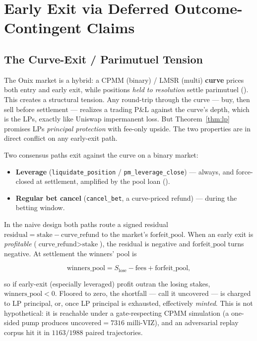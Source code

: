 \documentclass{ledger}
\theoremstyle{plain}
\theoremstyle{remark}
\begin{document}
\section{Early Exit via Deferred Outcome-Contingent Claims}\label{sec:earlyexit}

\subsection{The Curve-Exit / Parimutuel Tension}\label{sec:exittension}

The Onix market is a hybrid: a CPMM (binary) / LMSR (multi) \textbf{curve} prices
both entry and early exit, while positions \emph{held to resolution} settle
parimutuel (). This creates a structural tension. Any
round-trip through the curve --- buy, then sell before settlement --- realizes a
trading P\&L against the curve's depth, which is the LPs, exactly like Uniswap
impermanent loss. But Theorem~\ref{thm:lp} promises LPs \emph{principal
protection} with fee-only upside. The two properties are in direct conflict on
any early-exit path.

Two consensus paths exit against the curve on a binary market:

\begin{itemize}
  \item \textbf{Leverage} (\texttt{liquidate\_position} / \texttt{pm\_leverage\_close})
  --- always, and force-closed at settlement, amplified by the pool loan
  ().
  \item \textbf{Regular bet cancel} (\texttt{cancel\_bet}, a curve-priced refund)
  --- during the betting window.
\end{itemize}

In the naive design both paths route a signed residual
$\text{residual} = \text{stake} - \text{curve\_refund}$ to the market's
$\text{forfeit\_pool}$. When an early exit is \emph{profitable}
($\text{curve\_refund} > \text{stake}$), the residual is negative and
$\text{forfeit\_pool}$ turns negative. At settlement the winners' pool is

\[
\text{winners\_pool} = S_{\text{lose}} - \text{fees} + \text{forfeit\_pool},
\]

so if early-exit (especially leveraged) profit outran the losing stakes,
$\text{winners\_pool} < 0$. Floored to zero, the shortfall --- call it
$\text{uncovered}$ --- is charged to LP principal, or, once LP principal is
exhausted, effectively \emph{minted}. This is not hypothetical: it is reachable
under a gate-respecting CPMM simulation (a one-sided pump produces
$\text{uncovered} = 7316$ milli-VIZ), and an adversarial replay corpus hit it in
$1163/1988$ paired trajectories.
\end{document}
